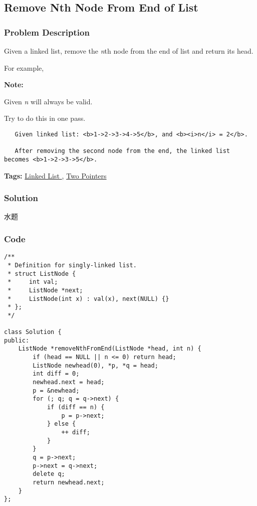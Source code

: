 \documentclass{article}
\begin{document}
\begin{CJK*}{UTF8}{gkai}
\subsection{ Remove Nth Node From End of List }
\label{ Remove Nth Node From End of List }

\subsubsection*{Problem Description}
Given a linked list, remove the \emph{n}th node from the end of list and return its head.

For example,

\textbf{Note:}


Given \emph{n} will always be valid.


Try to do this in one pass.

\begin{verbatim}
   Given linked list: <b>1->2->3->4->5</b>, and <b><i>n</i> = 2</b>.

   After removing the second node from the end, the linked list becomes <b>1->2->3->5</b>.
\end{verbatim}

\textbf{Tags: }
\hyperref[ Linked List ]{ Linked List },  \hyperref[ Two Pointers ]{ Two Pointers }



\subsubsection*{Solution}
水题

\subsubsection*{Code}
\begin{lstlisting}
/**
 * Definition for singly-linked list.
 * struct ListNode {
 *     int val;
 *     ListNode *next;
 *     ListNode(int x) : val(x), next(NULL) {}
 * };
 */

class Solution {
public:
    ListNode *removeNthFromEnd(ListNode *head, int n) {
        if (head == NULL || n <= 0) return head;
        ListNode newhead(0), *p, *q = head;
        int diff = 0;
        newhead.next = head;
        p = &newhead;
        for (; q; q = q->next) {
            if (diff == n) {
                p = p->next;
            } else {
                ++ diff;
            }
        }
        q = p->next;
        p->next = q->next;
        delete q;
        return newhead.next;
    }
}; 
\end{lstlisting}



\end{CJK*}
\end{document}

